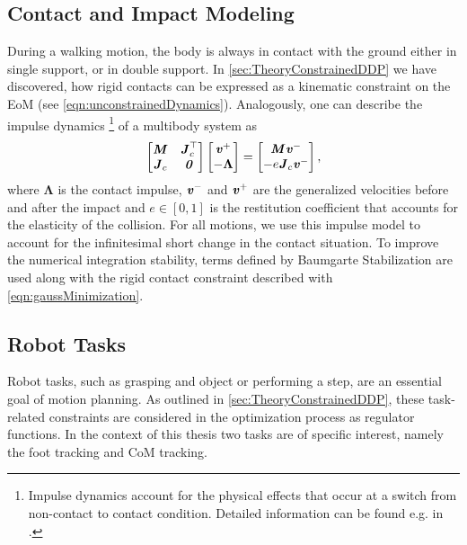 \subsection{Contact and Impact Modeling}
During a walking motion, the body is always in contact with the ground either in single support, or in double support. In \cref{sec:TheoryConstrainedDDP} we have discovered, how rigid contacts can be expressed as a kinematic constraint on the \gls{EoM} (see \cref{eqn:unconstrainedDynamics}). 
Analogously, one can describe the impulse dynamics
\footnote{Impulse dynamics account for the physical effects that occur at a switch from non-contact to contact condition. Detailed information can be found e.g. in \cite{featherstone2014rigid}.} 
of a multibody system as
\begin{equation}\label{eqn:ImpulseDynamics}
\left[\begin{matrix}\bm{\mathit{M}} & \bm{\mathit{J}}^{\top}_c \\{\bm{\mathit{J}}_{c}} & \bm{\mathit{0}}\end{matrix}\right] \left[\begin{matrix} \bm{\mathit{v}}^+ \\ -\boldsymbol{\Lambda} \end{matrix}\right] = \left[\begin{matrix} \bm{\mathit{M}}\bm{\mathit{v}}^- \\ -e\bm{\mathit{J}}_c \bm{\mathit{v}}^-\end{matrix}\right],
\end{equation}
where $\boldsymbol{\Lambda}$ is the contact impulse, $\bm{\mathit{v}}^-$ and $\bm{\mathit{v}}^+$ are the generalized velocities before and after the impact and $e\in [0,1]$ is the restitution coefficient that accounts for the elasticity of the collision. For all motions, we use this impulse model to account for the infinitesimal short change in the contact situation. To improve the numerical integration stability, terms defined by Baumgarte Stabilization \cite{baumgarte1972stabilization} are used along with the rigid contact constraint described with \cref{eqn:gaussMinimization}.

\subsection{Robot Tasks}
Robot tasks, such as grasping and object or performing a step, are an essential goal of motion planning. As outlined in \cref{sec:TheoryConstrainedDDP}, these task-related constraints are considered in the optimization process as regulator functions. In the context of this thesis two tasks are of specific interest, namely the foot tracking and \gls{CoM} tracking. 

